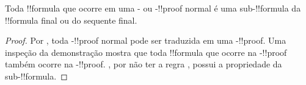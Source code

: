\documentclass[../../../include/open-logic-section]{subfiles}
\begin{document}
\begin{cor}
Toda !!{formula} que ocorre em uma - ou
-!!{proof} normal é uma sub-!!{formula} da !!{formula} final ou
do sequente final.
\end{cor}

\begin{proof}
  Por , toda -!!{proof} normal
  pode ser traduzida em uma -!!{proof}. Uma inspeção da demonstração
  mostra que toda !!{formula} que ocorre na -!!{proof}
  também ocorre na -!!{proof}. , por não ter a regra
  \Cut{}, possui a propriedade da sub-!!{formula}.
\end{proof}
\end{document}

